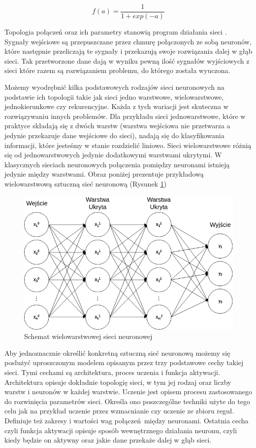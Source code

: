 \documentclass[12pt, oneside, a4paper]{report}
\begin{document}
\begin{equation}\label{eq: 2.6}
  f(a) = \frac{1}{1 + exp(-a)}
\end{equation}

Topologia połączeń oraz ich parametry stanowią program działania sieci \citep{tadeusiewicz1993sieci}. Sygnały wejściowe są przepuszczane przez chmurę połączonych ze sobą neuronów, które następnie przeliczają te sygnały i przekazują swoje rozwiązania dalej w głąb sieci. Tak przetworzone dane dają w wyniku pewną ilość sygnałów wyjściowych z sieci które razem są rozwiązaniem problemu, do którego została wyuczona.

Możemy wyodrębnić kilka podstawowych rodzajów sieci neuronowych na podstawie ich topologii takie jak sieci jedno warstwowe, wielowarstwowe, jednokierunkowe czy rekurencyjne. Każda z tych wariacji jest skuteczna w rozwiązywaniu innych problemów. Dla przykładu sieci jednowarstwowe, które w praktyce składają się z dwóch warstw (warstwa wejściowa nie przetwarza a jedynie przekazuje dane wejściowe do sieci), nadają się do klasyfikowania informacji, które jesteśmy w stanie rozdzielić liniowo. Sieci wielowarstwowe różnią się od jednowarstwowych jedynie dodatkowymi warstwami ukrytymi. W klasycznych sieciach neuronowych połączenia pomiędzy neuronami istnieją jedynie między warstwami. Obraz poniżej prezentuje przykładową wielowarstwową sztuczną sieć neuronową (Rysunek \ref{fig: 2.2})

\begin{figure}[h]
	\centering
	\includegraphics[width=12cm]{fig212.png}
	\caption{Schemat wielowarstwowej sieci neuronowej}
	\label{fig: 2.2}
\end{figure}

Aby jednoznacznie określić konkretną sztuczną sieć neuronową możemy się posłużyć uproszczonym modelem opisanym przez trzy podstawowe cechy takiej sieci. Tymi cechami są architektura, proces uczenia i funkcja aktywacji. Architektura opisuje dokładnie topologię sieci, w tym jej rodzaj oraz liczby warstw i neuronów w każdej warstwie. Uczenie jest opisem procesu zastosowanego do rozwinięcia parametrów sieci. Określa ono poszczególne techniki użyte do tego celu jak na przykład uczenie przez wzmacnianie czy uczenie ze zbioru reguł. Definiuje też zakresy i wartości wag połączeń między neuronami. Ostatnia cecha czyli funkcja aktywacji opisuje sposób wewnętrznego działania neuronu, czyli kiedy będzie on aktywny oraz jakie dane przekaże dalej w głąb sieci.
\end{document}
